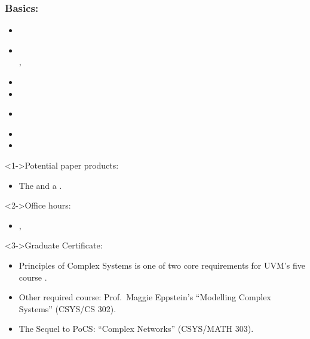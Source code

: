\begin{frame}
  \frametitle{Basics:}

  \begin{block}{}
  \begin{itemize}
  \item 
     \myname
  \item 
    \\
    \lectureroom, \meetingtimes
  \item 
     \officelocation
  \item 
     \myemail
  \item 
     \newline
    {\small
      \wordwikilinklong{\coursewebsite}{\coursewebsite}}
  \item
     \coursehandle
  \item
     \coursehashtag
  \end{itemize}
  \end{block}

\end{frame}

\begin{frame}

  \begin{block}<1->{Potential paper products:}
    \begin{itemize}
    \item<1-> 
      The 
      and a 
      .
    \end{itemize}
  \end{block}

  \begin{block}<2->{Office hours:}
    \begin{itemize}
    \item<2-> 
      \officehours, \\ \officelocation
    \end{itemize}
  \end{block}

  \begin{block}<3->{Graduate Certificate:}
    \begin{itemize}
    \item
      Principles of Complex Systems is one of two core requirements
      for UVM's five course
      .
    \item
     Other required course:  Prof.\ Maggie Eppstein's ``Modelling Complex Systems'' (CSYS/CS 302).
    \item
      The Sequel to PoCS: ``Complex Networks'' (CSYS/MATH 303).
    \end{itemize}
  \end{block}

\end{frame}


